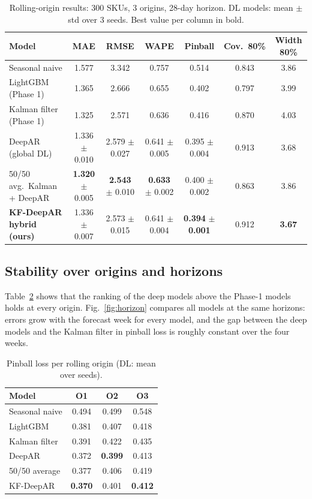 \documentclass[conference]{IEEEtran}
\begin{document}
\begin{table}[t]
\centering
\caption{Rolling-origin results: 300 SKUs, 3 origins, 28-day horizon. DL models: mean $\pm$ std over 3 seeds. Best value per column in bold.}
\label{tab:main}
\begin{tabular}{lcccccc}
\toprule
Model & MAE & RMSE & WAPE & Pinball & Cov.\ 80\% & Width 80\%\\
\midrule
Seasonal naive & 1.577 & 3.342 & 0.757 & 0.514 & 0.843 & 3.86\\
LightGBM (Phase 1) & 1.365 & 2.666 & 0.655 & 0.402 & 0.797 & 3.99\\
Kalman filter (Phase 1) & 1.325 & 2.571 & 0.636 & 0.416 & 0.870 & 4.03\\
DeepAR (global DL) & 1.336 $\pm$ 0.010 & 2.579 $\pm$ 0.027 & 0.641 $\pm$ 0.005 & 0.395 $\pm$ 0.004 & 0.913 & 3.68\\
50/50 avg.\ Kalman + DeepAR & \textbf{1.320} $\pm$ 0.005 & \textbf{2.543} $\pm$ 0.010 & \textbf{0.633} $\pm$ 0.002 & 0.400 $\pm$ 0.002 & 0.863 & 3.86\\
\textbf{KF-DeepAR hybrid (ours)} & 1.336 $\pm$ 0.007 & 2.573 $\pm$ 0.015 & 0.641 $\pm$ 0.004 & \textbf{0.394} $\pm$ \textbf{0.001} & 0.912 & \textbf{3.67}\\
\bottomrule
\end{tabular}
\end{table}

\subsection{Stability over origins and horizons}
Table~\ref{tab:origin} shows that the ranking of the deep models above the Phase-1 models holds at every origin. Fig.~\ref{fig:horizon}
compares all models at the same horizons: errors grow with the forecast week for every model, and the gap between the deep models and the
Kalman filter in pinball loss is roughly constant over the four weeks.

\begin{table}[t]
\centering
\caption{Pinball loss per rolling origin (DL: mean over seeds).}
\label{tab:origin}
\begin{tabular}{lccc}
\toprule
Model & O1 & O2 & O3\\
\midrule
Seasonal naive & 0.494 & 0.499 & 0.548\\
LightGBM & 0.381 & 0.407 & 0.418\\
Kalman filter & 0.391 & 0.422 & 0.435\\
DeepAR & 0.372 & \textbf{0.399} & 0.413\\
50/50 average & 0.377 & 0.406 & 0.419\\
KF-DeepAR & \textbf{0.370} & 0.401 & \textbf{0.412}\\
\bottomrule
\end{tabular}
\end{table}
\end{document}
